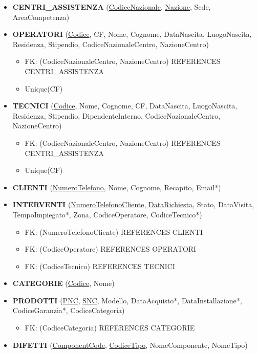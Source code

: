 \documentclass[a4paper, 12pt]{report}
\begin{document}
\begin{itemize}
	\item \textbf{CENTRI\_ASSISTENZA} (\underline{CodiceNazionale}, \underline{Nazione}, Sede, AreaCompetenza)
	\item \textbf{OPERATORI} (\underline{Codice}, CF, Nome, Cognome, DataNascita, LuogoNascita, Residenza, Stipendio, CodiceNazionaleCentro, NazioneCentro)
		\begin{itemize}[leftmargin=*, topsep=0pt]
			\item[] FK: (CodiceNazionaleCentro, NazioneCentro) REFERENCES CENTRI\_ASSISTENZA
			\item[] Unique(CF)
		\end{itemize}
	\item \textbf{TECNICI} (\underline{Codice}, Nome, Cognome, CF,  DataNascita, LuogoNascita, Residenza, Stipendio, DipendenteInterno, CodiceNazionaleCentro, NazioneCentro)
		\begin{itemize}[leftmargin=*, topsep=0pt]
			\item[] FK: (CodiceNazionaleCentro, NazioneCentro) REFERENCES CENTRI\_ASSISTENZA
			\item[] Unique(CF)
		\end{itemize}
	\item \textbf{CLIENTI} (\underline{NumeroTelefono}, Nome, Cognome, Recapito, Email*)
	\item \textbf{INTERVENTI} (\underline{NumeroTelefonoCliente}, \underline{DataRichiesta}, Stato, DataVisita, TempoImpiegato*, Zona, CodiceOperatore, CodiceTecnico*)
		\begin{itemize}[leftmargin=*, topsep=0pt]
			\item[] FK: (NumeroTelefonoCliente) REFERENCES CLIENTI
			\item[] FK: (CodiceOperatore) REFERENCES OPERATORI
			\item[] FK: (CodiceTecnico) REFERENCES TECNICI
		\end{itemize}		
	\item \textbf{CATEGORIE} (\underline{Codice}, Nome)
	\item \textbf{PRODOTTI} (\underline{PNC}, \underline{SNC}, Modello, DataAcquisto*, DataInstallazione*, CodiceGaranzia*, CodiceCategoria)
		\begin{itemize}[leftmargin=*, topsep=0pt]
			\item[] FK: (CodiceCategoria) REFERENCES CATEGORIE
		\end{itemize}		
	\item \textbf{DIFETTI} (\underline{ComponentCode}, \underline{CodiceTipo}, NomeComponente, NomeTipo)

\end{itemize}
\end{document}
